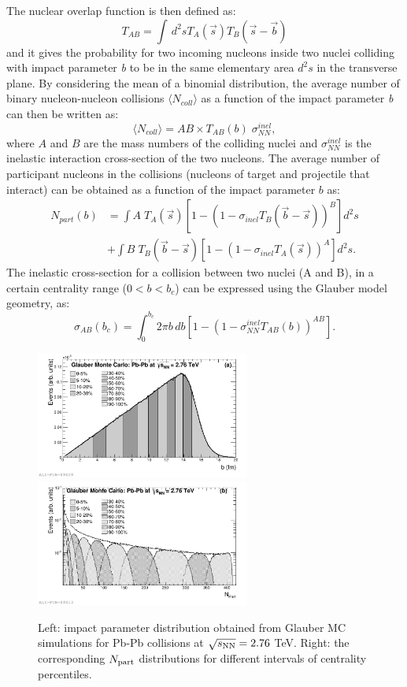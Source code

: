 The nuclear overlap function is then defined as:
\begin{equation}
T_{AB} = \int \,d^2s T_A(\vec s)T_B(\vec s - \vec b)
\end{equation}
and it gives the probability for two incoming nucleons inside two nuclei colliding 
with impact parameter \textit{b} to be in the same elementary area $d^2s$ in the transverse plane.
By considering the mean of a binomial distribution, the average number of 
binary nucleon-nucleon collisions $\langle N_{coll}\rangle$ as a function 
of the impact parameter \textit{b} can then be written as:
\begin{equation}
\langle N_{coll}\rangle = AB \times T_{AB}(b)\; \sigma^{inel}_{NN},
\end{equation}
where $A$ and $B$ are the mass numbers of the colliding nuclei and $\sigma^{inel}_{NN}$
is the inelastic interaction cross-section of the two nucleons.
The average number of participant nucleons in the collisions (nucleons of target 
and projectile that interact) can be obtained as a function of the impact parameter $b$ as:
\begin{equation}
\begin{aligned}
N_{part} (b) &= \int A \; T_A(\vec{s}) [1- (1- \sigma_{inel} T_B(\vec{b}-\vec{s}))^B]d^2s \\
& + \int B \; T_B(\vec{b}-\vec{s}) [1- (1- \sigma_{inel} T_A(\vec{s}))^A]d^2s.
\end{aligned}
\end{equation}
The inelastic cross-section for a collision between two nuclei (A and B), 
in a certain centrality range ($0 < b < b_c$) 
can be expressed using the Glauber model geometry, as:
\begin{equation}
\label{eq:sigmaABGlauber}
\sigma_{AB}(b_c) = \int_0^{b_c} 2\pi b\,db [1 - (1 - \sigma^{inel}_{NN}T_{AB}(b))^{AB}]. %
\end{equation}
\begin{figure}[!t]
\centering
\includegraphics[width=7cm]{FigCap1/Glauberimpactpar.pdf}
\includegraphics[width=7cm]{FigCap1/GlauberNpart.pdf}
\caption{Left: impact parameter distribution obtained from Glauber MC simulations for Pb-Pb collisions at $\sqrt{s_{\rm NN}} = 2.76$ TeV. Right: the corresponding $N_{\rm part}$ distributions for different intervals of centrality percentiles.}
\label{fig:glaubMC}
\end{figure}
